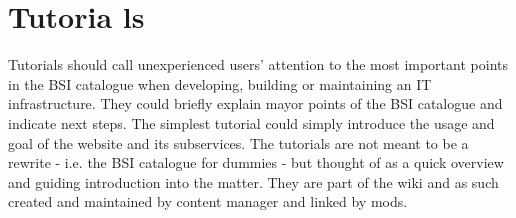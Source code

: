 \section{Tutoria ls}
\label{tutorials}

Tutorials should call unexperienced users' attention to the most important points in the BSI catalogue when developing, building or maintaining an IT infrastructure.
They could briefly explain mayor points of the BSI catalogue and indicate next steps.
The simplest tutorial could simply introduce the usage and goal of the website and its subservices.
The tutorials are not meant to be a rewrite - i.e. the BSI catalogue for dummies - but thought of as a quick overview and guiding introduction into the matter.
They are part of the wiki and as such created and maintained by content manager and linked by mods.

